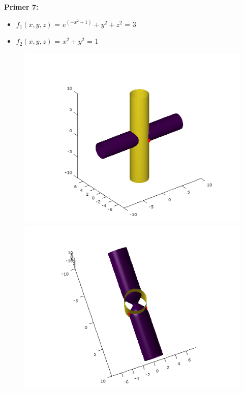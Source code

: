 \documentclass[12pt]{article}
\begin{document}
	\begin{minipage}{\textwidth}
	\textbf{\large{Primer 7:}}
	\begin{itemize}  
		\item $f_{1}(x,y,z)$ = $e^{(-x^{2}+1)}+y^{2}+z^{2}$ = 3
		\item $f_{2}(x,y,z)$ =  $x^2 + y^2$ = 1
	\end{itemize}
	\begin{figure}[H]
    	\centering
    	\includegraphics[scale=0.4]{primer7_1}
	    \includegraphics[scale=0.4]{primer7_2}

\end{figure}
\end{minipage}
\end{document}
